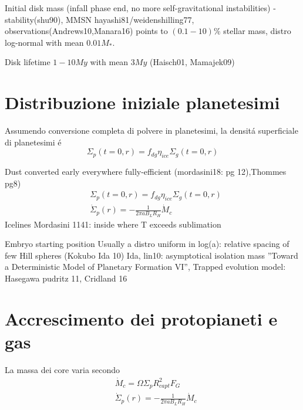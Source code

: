 \begin{workout}

Initial disk mass
(infall phase end, no more self-gravitational instabilities) - stability(shu90), MMSN hayashi81/weidenshilling77, observations(Andrews10,Manara16) points to $(0.1-10)\%$ stellar mass, distro log-normal with mean $0.01M_*$.

{Disk lifetime}
$1-10My$ with mean $3My$ (Haisch01, Mamajek09)


\end{workout}


\section{Distribuzione iniziale planetesimi}
Assumendo conversione completa di polvere in planetesimi, la densit\'a superficiale di planetesimi \'e
\begin{equation}
\Sigma_p(t=0,r)=f_{dg}\eta_{ice}\Sigma_g(t=0,r)
\end{equation}

\begin{workout}
Dust converted early everywhere fully-efficient (mordasini18: pg 12),Thommes pg8)
\begin{align*}
&\Sigma_p(t=0,r)=f_{dg}\eta_{ice}\Sigma_g(t=0,r)\\
&\dot{\Sigma}_p(r)=-\frac{1}{2\pi aB_LR_H}\dot{M}_c
\end{align*}
Icelines Mordasini 1141: inside where T exceeds sublimation

{Embryo starting position}
Usually a distro uniform in log(a): relative spacing of few Hill spheres (Kokubo Ida 10)
Ida, lin10: asymptotical isolation mass ''Toward a Deterministic Model of Planetary Formation VI'',
Trapped evolution model: Hasegawa pudritz 11, Cridland 16

\end{workout}

\section{Accrescimento dei protopianeti e gas}

La massa dei core varia secondo
\begin{align}
&\dot{M}_c=\Omega\Sigma_pR^2_{capt}F_G\\
&\dot{\Sigma}_p(r)=-\frac{1}{2\pi aB_LR_H}\dot{M}_c
\end{align}

